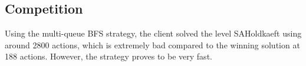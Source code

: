 \documentclass[Main]{subfiles}
\begin{document}
\subsection{Competition}


Using the multi-queue BFS strategy, the client solved the level SAHoldkaeft using around 2800 actions, which is extremely bad compared to the winning solution at 188 actions. However, the strategy proves to be very fast. 
\end{document}
